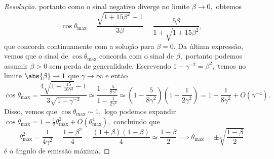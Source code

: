 \begin{proof}[Resolução]
    portanto como o sinal negativo diverge no limite \(\beta \to 0,\) obtemos
    \begin{equation*}
        \cos \theta_{\mathrm{max}} = \frac{\sqrt{1 + 15 \beta^2} - 1}{3\beta} = \frac{5 \beta}{1 + \sqrt{1 + 15 \beta^2}},
    \end{equation*}
    que concorda continuamente com a solução para \(\beta = 0.\) Da última expressão, vemos que o sinal de \(\cos\theta_{\mathrm{max}}\) concorda com o sinal de \(\beta,\) portanto podemos assumir \(\beta > 0\) sem perda de generalidade. Escrevendo \(1 - \gamma^{-2} = \beta^2,\) temos no limite \(\abs{\beta} \to 1\) que \(\gamma \to \infty\) e então
    \begin{equation*}
        \cos\theta_{\mathrm{max}} = \frac{4\sqrt{1 - \frac{15}{16 \gamma^2}} - 1}{3\sqrt{1 - \gamma^{-2}}} \simeq \frac{1 - \frac{5}{8 \gamma^2}}{1 - \frac{1}{2 \gamma^2}} \simeq \left(1 - \frac{5}{8 \gamma^2}\right)\left(1 + \frac{1}{2 \gamma^2}\right) = 1 - \frac{1}{8 \gamma^2} + O(\gamma^{-4}).
    \end{equation*}
    Disso, vemos que \(\cos\theta_{\mathrm{max}} \sim 1,\) logo podemos expandir \(\cos\theta_{\mathrm{max}} = 1 - \frac12 \theta_{\mathrm{max}}^2 + O(\theta_{\mathrm{max}}^4),\) concluindo que 
    \begin{equation*}
        \theta_{\mathrm{max}}^2 = \frac{1}{4 \gamma^2} = \frac{1 - \beta^2}{4} = \frac{(1 + \beta)(1 - \beta)}{4} \simeq \frac{1 - \beta}{2} \implies \theta_{\mathrm{max}} = \pm\sqrt{\frac{1 - \beta}{2}}
    \end{equation*}
    é o ângulo de emissão máxima.
\end{proof}
